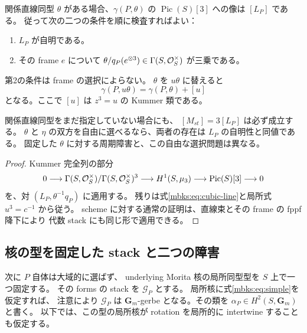 \begin{corollary}
\label{mbks:cor:picard-phase}
関係直線同型 $\theta$ がある場合、$\gamma(P,\theta)$ の
$\operatorname{Pic}(S)[3]$ への像は $[L_P]$ である。
従って次の二つの条件を順に検査すればよい：
\begin{enumerate}
 \item $L_P$ が自明である。
 \item その frame $e$ について
 $\theta/q_P(e^{\otimes3})\in\Gamma(S,\mathcal O_S^\times)$ が三乗である。
\end{enumerate}
第2の条件は frame の選択によらない。
$\theta$ を $u\theta$ に替えると
\begin{equation}\label{mbks:eq:theta-change}
 \gamma(P,u\theta)=\gamma(P,\theta)+[u]
\end{equation}
となる。ここで $[u]$ は $z^3=u$ の Kummer 類である。

関係直線同型をまだ指定していない場合にも、
$[M_{st}]=3[L_P]$ は必ず成立する。
$\theta$ と $\eta$ の双方を自由に選べるなら、両者の存在は $L_P$ の自明性と同値である。
固定した $\theta$ に対する周期障害と、この自由な選択問題は異なる。
\end{corollary}
\begin{proof}
Kummer 完全列\cite{NFMStacksKummer}の部分
\[
 0\longrightarrow
 \Gamma(S,\mathcal O_S^\times)/\Gamma(S,\mathcal O_S^\times)^3
 \longrightarrow H^1(S,\mu_3)
 \longrightarrow\operatorname{Pic}(S)[3]\longrightarrow0
\]
を、対 $(L_P,\theta^{-1}q_P)$ に適用する。
残りは式\eqref{mbks:eq:cubic-line}と局所式 $u^3=c^{-1}$ から従う。
scheme に対する通常の証明は、直線束とその frame の fppf 降下により
代数 stack にも同じ形で適用できる。
\end{proof}

\subsection{核の型を固定した stack と二つの障害}

次に $P$ 自体は大域的に選ばず、
underlying Morita 核の局所同型型を $S$ 上で一つ固定する。
その forms の stack を $\mathscr G_P$ とする。
局所核に式\eqref{mbks:eq:simple}を仮定すれば、
注意により $\mathscr G_P$ は
$\mathbf G_m$-gerbe となる。その類を $\alpha_P\in H^2(S,\mathbf G_m)$ と書く。
以下では、この型の局所核が rotation を局所的に intertwine することも仮定する。

